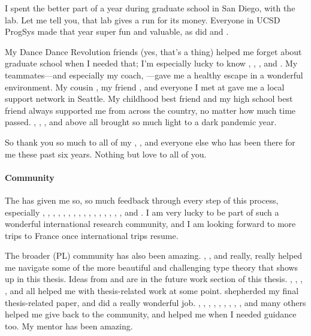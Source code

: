 I spent the better part of a year during graduate school in San Diego, with the  lab.
Let me tell you, that lab gives  a run for its money.
Everyone in UCSD ProgSys made that year super fun and valuable,
as did  and .

My Dance Dance Revolution friends (yes, that's a thing) helped me forget about graduate school when I needed that;
I'm especially lucky to know , , , and .
My  teammates---and especially my coach, ---gave me a healthy escape in a wonderful environment.
My cousin , my friend , and everyone I met at  gave me a local support network in Seattle.
My childhood best friend  and my high school best friend  always supported me from across the country,
no matter how much time passed. , , , and above all  brought so much light to a dark pandemic year.

So thank you so much to all of my , , and everyone else who has been there for me these past six years.
Nothing but love to all of you.

\paragraph{Community}
The  has given me so, so much feedback through every step of this process,
especially , , , , , , , , , , , , , , , , and .
I am very lucky to be part of such a wonderful international research community, and I am looking forward to more trips to France
once international trips resume.

The broader  (PL) community has also been amazing.
, , and  really, really helped me navigate
some of the more beautiful and challenging type theory that shows up in this thesis.
Ideas from  and  are in the future work section of this thesis.
, , , , and  all helped me with
thesis-related work at some point.
 shepherded my final thesis-related paper, and did a really wonderful job.
, , , ,
, , , , , and many others helped me give back to the community,
and helped me when I needed guidance too.
My mentor  has been amazing.

